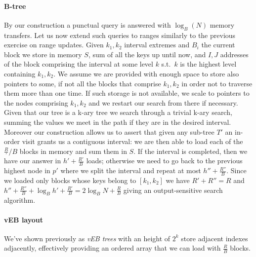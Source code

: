 \paragraph{B-tree}
By our construction a punctual query is answered with $\log_B(N)$ memory transfers.
Let us now extend such queries to ranges similarly to the previous exercise on range updates.
Given $k_1, k_2$ interval extremes and $B_i$ the current block we store in memory $S$, sum of all the keys up until now, and $I, J$ addresses of the block comprising the interval at some level $k$ s.t.\ $k$ is the highest level containing $k_1, k_2$.
We assume we are provided with enough space to store also pointers to some, if not all the blocks that comprise $k_1, k_2$ in order not to traverse them more than one time.
If such storage is not available, we scale to pointers to the nodes comprising $k_1, k_2$ and we restart our search from there if necessary.
Given that our tree is a k-ary tree we search through a trivial k-ary search, summing the values we meet in the path if they are in the desired interval.
Moreover our construction allows us to assert that given any sub-tree $T'$ an in-order visit grants us a contiguous interval: we are then able to load each of the $\frac{R}'/{B}$ blocks in memory and sum them in $S$.
If the interval is completed, then we have our answer in $h' + \frac{R'}{B}$ loads; otherwise we need to go back to the previous highest node in $p'$ where we split the interval and repeat at most $h'' + \frac{R''}{B}$.
Since we loaded only blocks whose keys belong to $[k_1, k_2]$ we have $R' + R'' = R$ and $h'' + \frac{R''}{B} + \log_B{h'} + \frac{R'}{B} = 2\log_B{N} + \frac{R}{B}$ giving an output-sensitive search algorithm.

\paragraph{vEB layout} We've shown previously as \emph{vEB trees} with an height of $2^k$ store adjacent indexes adjacently, effectively providing an ordered array that we can load with $\frac{R}{B}$ blocks.

